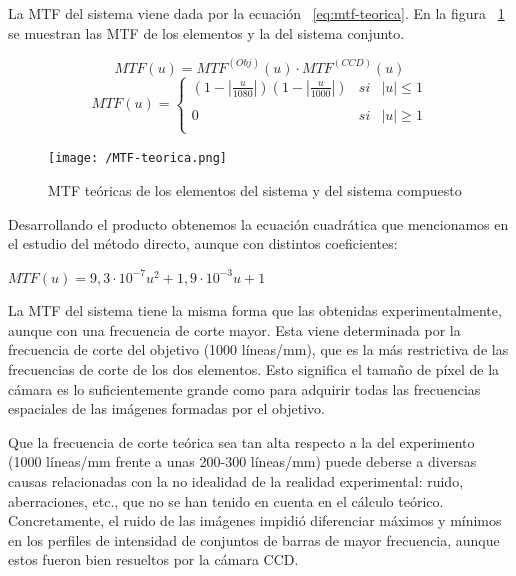 \documentclass{./packages/optica-article}
\begin{document}
\begin{enumerate}
\begin{enumerate}
		    La MTF del sistema viene dada por la ecuación ~\ref{eq:mtf-teorica}. En la figura ~\ref{fig:mtf-teorica} se muestran las MTF de los elementos y la del sistema conjunto.
		    
		    \begin{equation}
		        MTF(u) = MTF^{(Obj)}(u) \cdot MTF^{(CCD)}(u)
		    \end{equation}
		    \begin{equation}
		        MTF(u)= \left\{ \begin{array}{lcc}
                     (1-|\frac{u}{1080}|)(1-|\frac{u}{1000}|) &   si  & |u| \leq 1 \\
                     \\ 0 &  si & |u| \geq 1 \\
                     \end{array}
                    \right.
                    \label{eq:mtf-teorica}
		    \end{equation}
		        
		    
		    \begin{figure}
		        \centering
		        \texttt{[image: /MTF-teorica.png]}
		        \caption{MTF teóricas de los elementos del sistema y del sistema compuesto}
		        \label{fig:mtf-teorica}
		    \end{figure}
		    
		    Desarrollando el producto obtenemos la ecuación cuadrática que mencionamos en el estudio del método directo, aunque con distintos coeficientes:
		    
		    \begin{center}
		        \begin{math}
		        MTF(u) = 9,3 \cdot 10^{-7} u^2 + 1,9 \cdot 10^{-3} u + 1
		        \end{math}
		    \end{center}
		    
		    La MTF del sistema tiene la misma forma que las obtenidas experimentalmente, aunque con una frecuencia de corte mayor. Esta viene determinada por la frecuencia de corte del objetivo (1000 líneas/mm), que es la más restrictiva de las frecuencias de corte de los dos elementos. Esto significa el tamaño de píxel de la cámara es lo suficientemente grande como para adquirir todas las frecuencias espaciales de las imágenes formadas por el objetivo. 
		    
		    Que la frecuencia de corte teórica sea tan alta respecto a la del experimento (1000 líneas/mm frente a unas 200-300 líneas/mm) puede deberse a diversas causas relacionadas con la no idealidad de la realidad experimental: ruido, aberraciones, etc., que no se han tenido en cuenta en el cálculo teórico. Concretamente, el ruido de las imágenes impidió diferenciar máximos y mínimos en los perfiles de intensidad de conjuntos de barras de mayor frecuencia, aunque estos fueron bien resueltos por la cámara CCD. 
		    
		\end{enumerate}
		
	\end{enumerate}
\end{document}
